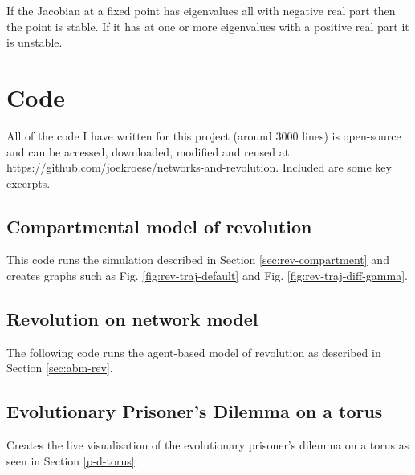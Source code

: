 If the Jacobian at a fixed point has eigenvalues all with negative real part then the point is
stable. If it has at one or more eigenvalues with a positive real part it is unstable\cite{Izhikevich:2007}.
\section{Code}
All of the code I have written for this project (around 3000 lines) is open-source and can be accessed, downloaded, modified and reused at \url{https://github.com/joekroese/networks-and-revolution}. Included are some key excerpts.
\subsection{Compartmental model of revolution}
This code runs the simulation described in Section \ref{sec:rev-compartment} and creates graphs such as Fig. \ref{fig:rev-traj-default} and Fig. \ref{fig:rev-traj-diff-gamma}.

\subsection{Revolution on network model}
The following code runs the agent-based model of revolution as described in Section \ref{sec:abm-rev}.


\subsection{Evolutionary Prisoner's Dilemma on a torus}
Creates the live visualisation of the evolutionary prisoner's dilemma on a torus as seen in Section \ref{p-d-torus}.


